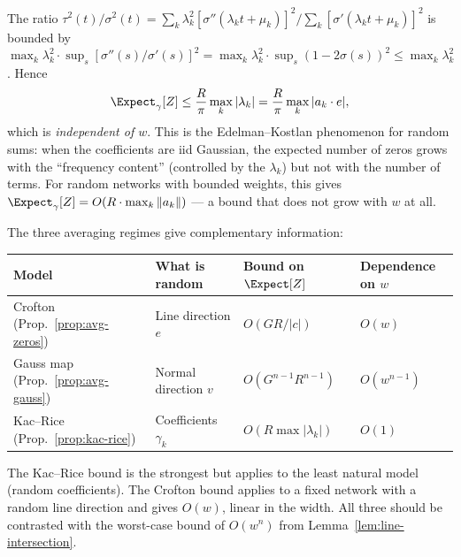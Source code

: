 \begin{remark}
The ratio $\tau^2(t)/\sigma^2(t) = \sum_k \lambda_k^2 [\sigma''(\lambda_k t+\mu_k)]^2 / \sum_k [\sigma'(\lambda_k t+\mu_k)]^2$ is bounded by $\max_k \lambda_k^2 \cdot \sup_s [\sigma''(s)/\sigma'(s)]^2 = \max_k \lambda_k^2 \cdot \sup_s (1-2\sigma(s))^2 \leq \max_k \lambda_k^2$. Hence
\begin{equation*}
  \Expect_\gamma[Z] \leq \frac{R}{\pi}\max_k |\lambda_k| = \frac{R}{\pi}\max_k |a_k\cdot e|,
\end{equation*}
which is \emph{independent of $w$}. This is the Edelman--Kostlan phenomenon for random sums: when the coefficients are iid Gaussian, the expected number of zeros grows with the ``frequency content'' (controlled by the $\lambda_k$) but not with the number of terms. For random networks with bounded weights, this gives $\Expect_\gamma[Z] = O(R\cdot \max_k \|a_k\|)$ --- a bound that does not grow with $w$ at all.
\end{remark}

\begin{remark}
The three averaging regimes give complementary information:
\begin{center}
\begin{tabular}{llll}
  \toprule
  Model & What is random & Bound on $\Expect[Z]$ & Dependence on $w$ \\
  \midrule
  Crofton (Prop.~\ref{prop:avg-zeros}) & Line direction $e$ & $O(G R/|c|)$ & $O(w)$ \\
  Gauss map (Prop.~\ref{prop:avg-gauss}) & Normal direction $v$ & $O(G^{n-1}R^{n-1})$ & $O(w^{n-1})$ \\
  Kac--Rice (Prop.~\ref{prop:kac-rice}) & Coefficients $\gamma_k$ & $O(R\max|\lambda_k|)$ & $O(1)$ \\
  \bottomrule
\end{tabular}
\end{center}
The Kac--Rice bound is the strongest but applies to the least natural model (random coefficients). The Crofton bound applies to a fixed network with a random line direction and gives $O(w)$, linear in the width. All three should be contrasted with the worst-case bound of $O(w^n)$ from Lemma~\ref{lem:line-intersection}.
\end{remark}

